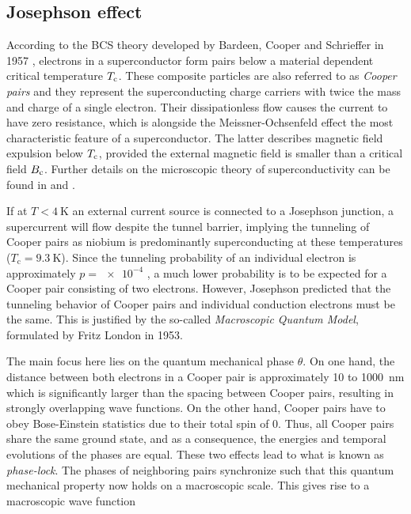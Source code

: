         
\subsection{Josephson effect}

According to the BCS theory developed by Bardeen, Cooper and Schrieffer in 1957 \cite{Bardeen1957}, electrons in a superconductor form pairs below a material dependent critical temperature $T_{\rm c}$. These composite particles are also referred to as \textit{Cooper pairs} and they represent the superconducting charge carriers with twice the mass and charge of a single electron. Their dissipationless flow causes the current to have zero resistance, which is alongside the Meissner-Ochsenfeld effect \cite{Meissner1933} the most characteristic feature of a superconductor. The latter describes magnetic field expulsion below $T_{\rm c}$, provided the external magnetic field is smaller than a critical field $B_{\rm c}$. Further details on the microscopic theory of superconductivity can be found in \cite{Bardeen1957} and \cite{Ginzburg1950}.

If at $T < \qty{4}{\kelvin}$ an external current source is connected to a Josephson junction, a supercurrent will flow despite the tunnel barrier, implying the tunneling of Cooper pairs as niobium is predominantly superconducting at these temperatures ($T_\mathrm{c} = \qty{9.3}{\kelvin}$). Since the tunneling probability of an individual electron is approximately $p = \num{e-4}$ \cite{Gross2016}, a much lower probability is to be expected for a Cooper pair consisting of two electrons. However, Josephson predicted that the tunneling behavior of Cooper pairs and individual conduction electrons must be the same. This is justified by the so-called \textit{Macroscopic Quantum Model}, formulated by Fritz London in 1953.

The main focus here lies on the quantum mechanical phase $\theta$. On one hand, the distance between both electrons in a Cooper pair is approximately 10 to \qty{1000}{\nm} which is significantly larger than the spacing between Cooper pairs, resulting in strongly overlapping wave functions. On the other hand, Cooper pairs have to obey Bose-Einstein statistics due to their total spin of 0. Thus, all Cooper pairs share the same ground state, and as a consequence, the energies and temporal evolutions of the phases are equal. These two effects lead to what is known as \textit{phase-lock}. The phases of neighboring pairs synchronize such that this quantum mechanical property now holds on a macroscopic scale. This gives rise to a macroscopic wave function

